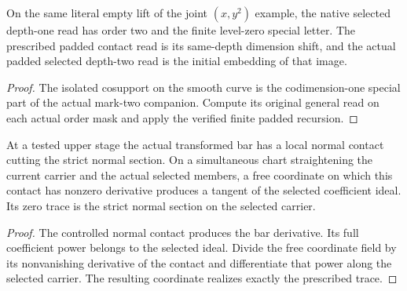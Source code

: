 \begin{theorem}
\label{hir:g1-finite-example-full-native-value}
\leanok
On the same literal empty lift of the joint $(x,y^2)$ example,
the native selected depth-one read has order two and the finite
level-zero special letter. The prescribed padded contact read is
its same-depth dimension shift, and the actual padded selected
depth-two read is the initial embedding of that image.
\end{theorem}
\begin{proof}
The isolated cosupport on the smooth curve is the codimension-one
special part of the actual mark-two companion. Compute its original
general read on each actual order mask and apply the verified
finite padded recursion.
\end{proof}

\begin{theorem}
\label{hir:g1-later-positive-selected-chart-contact}
\leanok
At a tested upper stage the actual transformed bar has a local
normal contact cutting the strict normal section. On a simultaneous
chart straightening the current carrier and the actual selected
members, a free coordinate on which this contact has nonzero
derivative produces a tangent of the selected coefficient ideal.
Its zero trace is the strict normal section on the selected carrier.
\end{theorem}
\begin{proof}
The controlled normal contact produces the bar derivative. Its full
coefficient power belongs to the selected ideal. Divide the free
coordinate field by its nonvanishing derivative of the contact and
differentiate that power along the selected carrier. The resulting
coordinate realizes exactly the prescribed trace.
\end{proof}

